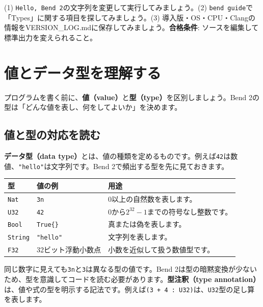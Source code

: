 \documentclass[11pt,a4paper,openany]{book}
\newcommand{\code}[1]{\texttt{#1}}
\newcommand{\file}[1]{\textsf{\color{blue}#1}}
\newcommand{\term}[1]{\textbf{#1}}
\newcommand{\exercise}[1]{\begin{exercisebox}#1\end{exercisebox}}
\begin{document}
\exercise{(1) \code{Hello, Bend 2}の文字列を変更して実行してみましょう。(2) \code{bend guide}で「Types」に関する項目を探してみましょう。(3) 導入版・OS・CPU・Clangの情報を\file{VERSION\_LOG.md}に保存してみましょう。\textbf{合格条件}: ソースを編集して標準出力を変えられること。}

\chapter{値とデータ型を理解する}
\begin{tcolorbox}[colback=blue!3,colframe=blue!16,boxrule=.35pt,arc=1mm,left=3mm,right=3mm,top=2mm,bottom=2mm]
\small プログラムを書く前に、\term{値（value）}と\term{型（type）}を区別しましょう。Bend 2の型は「どんな値を表し、何をしてよいか」を決めます。
\end{tcolorbox}

\section{値と型の対応を読む}
\term{データ型（data type）}とは、値の種類を定めるものです。例えば\code{42}は数値、\code{"hello"}は文字列です。Bend 2で頻出する型を先に見ておきます。

\begin{tabularx}{\linewidth}{@{}L{23mm}L{42mm}X@{}}
\toprule 型 & 値の例 & 用途\\\midrule
\code{Nat} & \code{3n} & 0以上の自然数を表します。\\
\code{U32} & \code{42} & 0から$2^{32}-1$までの符号なし整数です。\\
\code{Bool} & \code{True\{\}} & 真または偽を表します。\\
\code{String} & \code{"hello"} & 文字列を表します。\\
\code{F32} & 32ビット浮動小数点 & 小数を近似して扱う数値型です。\\
\bottomrule
\end{tabularx}
同じ数字に見えても\code{3n}と\code{3}は異なる型の値です。Bend 2は型の暗黙変換が少ないため、型を意識してコードを読む必要があります。\term{型注釈（type annotation）}は、値や式の型を明示する記法です。例えば\code{(3 + 4 : U32)}は、\code{U32}型の足し算を表します。
\end{document}
